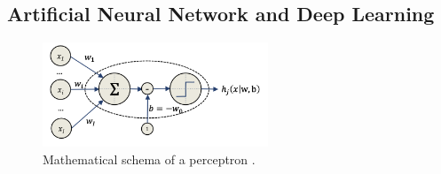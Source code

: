\subsection{Artificial Neural Network and Deep Learning}
\label{subsec:deepl}
\begin{figure}
    \centering
    \includegraphics[width=0.6\textwidth]{Images/neurone.png}
    \caption[Perceptron schema]{Mathematical schema of a perceptron \cite{matteo_matteucci_perceptrons_2021}.}
    \label{fig:perceptron}
\end{figure}

